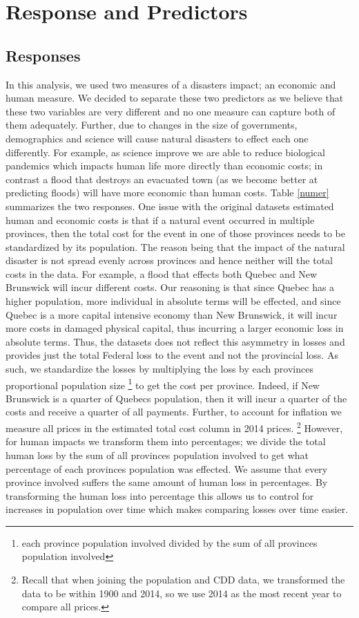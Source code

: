 \section{Response and Predictors}
\subsection{Responses}
In this analysis, we used two measures of a disasters impact; an economic and human measure. We decided to separate these two predictors as we believe that these two variables are very different and no one measure can capture both of them adequately. Further, due to changes in the size of governments, demographics and science will cause natural disasters to effect each one differently. For example, as science improve we are able to reduce biological pandemics which impacts human life more directly than economic costs; in contrast a flood that destroys an evacuated town (as we become better at predicting floods) will have more economic than human costs.
Table \ref{numer} summarizes the two responses. One issue with the original datasets estimated human and economic costs is that if a natural event occurred in multiple provinces, then the total cost for the event in one of those provinces needs to be standardized by its population. The reason being that the impact of the natural disaster is not spread evenly across provinces and hence neither will the total costs in the data.
For example, a flood that effects both Quebec and New Brunswick will incur different costs. Our reasoning is that since Quebec has a higher population, more individual in absolute terms will be effected, and since Quebec is a more capital intensive economy than New Brunswick, it will incur more costs in damaged physical capital, thus incurring a larger economic loss in absolute terms. Thus, the datasets does not reflect this asymmetry in losses and provides just the total Federal loss to the event and not the provincial loss.
As such, we standardize the losses by multiplying the loss by each provinces proportional population size \footnote{each province population involved divided by the sum of all provinces population involved} to get the cost per province. Indeed, if New Brunswick is a quarter of Quebecs population, then it will incur a quarter of the costs and receive a quarter of all payments. Further, to account for inflation we measure all prices in the estimated total cost column in 2014 prices. \footnote{Recall that when joining the population and CDD data, we transformed the data to be within 1900 and 2014, so we use 2014 as the most recent year to compare all prices.}
However, for human impacts we transform them into percentages; we divide the total human loss by the sum of all provinces population involved to get what percentage of each provinces population was effected. We assume that every province involved suffers the same amount of human loss in percentages. By transforming the human loss into percentage this allows us to control for increases in population over time which makes comparing losses over time easier.

